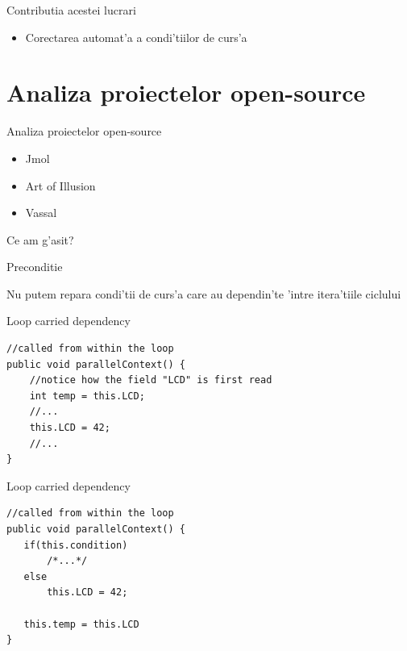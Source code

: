 \documentclass{beamer}
\begin{document}
\begin{frame}{Contributia acestei lucrari}
\huge
\begin{itemize}
  \item Corectarea automat'a a condi'tiilor de curs'a
\end{itemize}
\end{frame}

\section{Analiza proiectelor open-source}
\begin{frame}{Analiza proiectelor open-source}
\Huge
{}
\normalsize
\pause \begin{itemize}
  \item Jmol
  \item Art of Illusion
  \item Vassal
\end{itemize}
\end{frame}

\begin{frame}
\Huge 
\begin{center}
Ce am g'asit?
\end{center}
\end{frame}

\begin{frame}{Preconditie}
\Huge
\begin{center}Nu putem repara condi'tii de curs'a care au 
dependin'te 'intre itera'tiile ciclului
\end{center}
\pause 
\end{frame}

\begin{frame}[fragile]{Loop carried dependency}
\begin{lstlisting}
//called from within the loop
public void parallelContext() {
    //notice how the field "LCD" is first read
    int temp = this.LCD;
    //...
    this.LCD = 42;
    //...
}
\end{lstlisting}
\end{frame}

\begin{frame}[fragile]{Loop carried dependency}
\begin{lstlisting}
//called from within the loop
public void parallelContext() {
   if(this.condition)
       /*...*/
   else
       this.LCD = 42;    
   
   this.temp = this.LCD
}
\end{lstlisting}
\end{frame}
\end{document}
